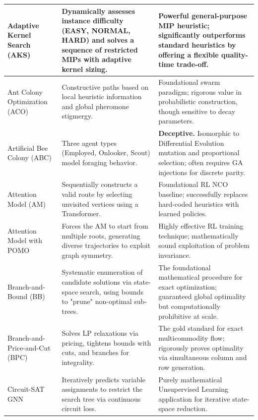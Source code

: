 \documentclass[orivec,runningheads]{llncs}
\begin{document}
\begin{center}
\begin{longtable}
\begin{center}
\begin{longtable}{
  >{\raggedright\arraybackslash}p{}
  >{\raggedright\arraybackslash}p{}
  >{\raggedright\arraybackslash}p{}
}
Adaptive Kernel Search (AKS) & Dynamically assesses instance difficulty (EASY, NORMAL, HARD) and solves a sequence of restricted MIPs with adaptive kernel sizing. & Powerful general-purpose MIP heuristic; significantly outperforms standard heuristics by offering a flexible quality-time trade-off. \\ \midrule

Ant Colony Optimization (ACO) & Constructive paths based on local heuristic information and global pheromone stigmergy. & Foundational swarm paradigm; rigorous value in probabilistic construction, though sensitive to decay parameters. \\ \midrule

Artificial Bee Colony (ABC) & Three agent types (Employed, Onlooker, Scout) model foraging behavior. & \textbf{Deceptive.} Isomorphic to Differential Evolution mutation and proportional selection; often requires GA injections for discrete parity. \\ \midrule

Attention Model (AM) & Sequentially constructs a valid route by selecting unvisited vertices using a Transformer. & Foundational RL NCO baseline; successfully replaces hard-coded heuristics with learned policies. \\ \midrule

Attention Model with POMO & Forces the AM to start from multiple roots, generating diverse trajectories to exploit graph symmetry. & Highly effective RL training technique; mathematically sound exploitation of problem invariance. \\ \midrule

Branch-and-Bound (BB) & Systematic enumeration of candidate solutions via state-space search, using bounds to "prune" non-optimal sub-trees. & The foundational mathematical procedure for exact optimization; guaranteed global optimality but computationally prohibitive at scale. \\ \midrule

Branch-and-Price-and-Cut (BPC) & Solves LP relaxations via pricing, tightens bounds with cuts, and branches for integrality. & The gold standard for exact multicommodity flow; rigorously proves optimality via simultaneous column and row generation. \\ \midrule

Circuit-SAT GNN & Iteratively predicts variable assignments to restrict the search tree via continuous circuit loss. & Purely mathematical Unsupervised Learning application for iterative state-space reduction. \\ \midrule


\end{longtable}
\end{center}
\end{longtable}
\end{center}
\end{document}
